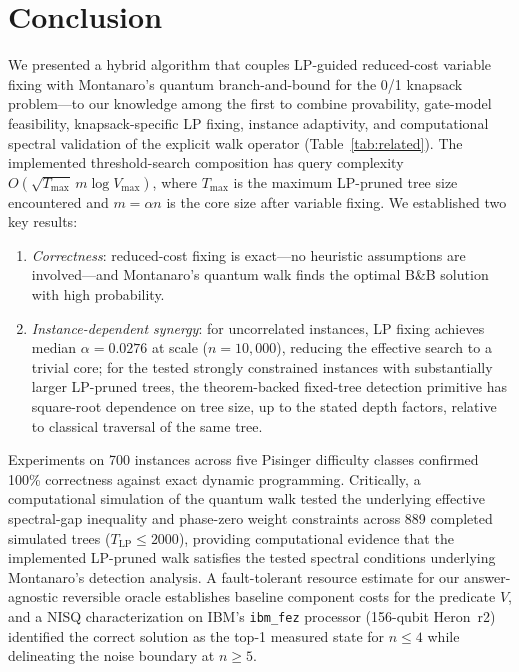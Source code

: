 \documentclass[conference]{IEEEtran} \IEEEoverridecommandlockouts
\begin{document}
\section{Conclusion}

We presented a hybrid algorithm that couples LP-guided reduced-cost variable fixing with Montanaro's quantum branch-and-bound for the 0/1 knapsack problem---to our knowledge among the first to combine provability, gate-model feasibility, knapsack-specific LP fixing, instance adaptivity, and computational spectral validation of the explicit walk operator (Table~\ref{tab:related}). The implemented threshold-search composition has query complexity $O\!\left(\sqrt{T_{\max}}\,m\log V_{\max}\right)$, where $T_{\max}$ is the maximum LP-pruned tree size encountered and $m = \alpha n$ is the core size after variable fixing. We established two key results:

\begin{enumerate}     \item \textit{Correctness}: reduced-cost fixing is exact---no heuristic assumptions are involved---and Montanaro's quantum walk finds the optimal B\&B solution with high probability.     \item \textit{Instance-dependent synergy}: for uncorrelated instances, LP fixing achieves median $\alpha = 0.0276$ at scale ($n = 10{,}000$), reducing the effective search to a trivial core; for the tested strongly constrained instances with substantially larger LP-pruned trees, the theorem-backed fixed-tree detection primitive has square-root dependence on tree size, up to the stated depth factors, relative to classical traversal of the same tree.     \end{enumerate}

Experiments on 700 instances across five Pisinger difficulty classes confirmed 100\% correctness against exact dynamic programming. Critically, a computational simulation of the quantum walk tested the underlying effective spectral-gap inequality and phase-zero weight constraints across 889 completed simulated trees ($T_{\text{LP}} \le 2000$), providing computational evidence that the implemented LP-pruned walk satisfies the tested spectral conditions underlying Montanaro's detection analysis. A fault-tolerant resource estimate for our answer-agnostic reversible oracle establishes baseline component costs for the predicate $V$, and a NISQ characterization on IBM's \texttt{ibm\_fez} processor (156-qubit Heron~r2) identified the correct solution as the top-1 measured state for $n \leq 4$ while delineating the noise boundary at $n \geq 5$.
\end{document}
